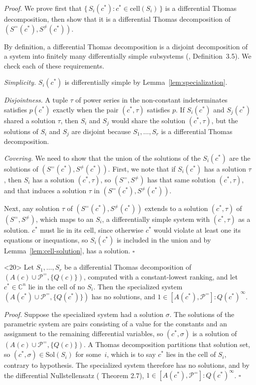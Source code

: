 \documentclass{article}
\theoremstyle{definition}
\theoremstyle{plain}
\newcommand{\qedbox}{\hspace*{\fill}\ensuremath{\square}}
\begin{document}
  {\it Proof.}
  We prove first that $\{\, S_i(c^*) : c^* \in \mathrm{cell}(S_i) \,\}$ is a differential
  Thomas decomposition, then show that it is a differential Thomas decomposition of $(S^=(c^*), S^{\ne}(c^*))$.

  By definition, a differential Thomas decomposition is a disjoint decomposition of a system into finitely many differentially simple
  subsystems (\cite{ThomasDecomp}, Definition~3.5).  We check each of these requirements.

  {\it Simplicity.}  $S_i(c^*)$ is differentially simple by
  Lemma~\ref{lem:specialization}.

  {\it Disjointness.}
  A tuple $\tau$ of power
  series in the non-constant indeterminates satisfies $p(c^*)$ exactly when the pair
  $(c^*, \tau)$ satisfies $p$.
  If $S_i(c^*)$ and $S_j(c^*)$ shared a solution $\tau$, then $S_i$ and $S_j$ would share the solution $(c^*, \tau)$,
  but the solutions of $S_i$ and $S_j$ are disjoint because $S_1, \ldots, S_r$ is a differential Thomas decomposition.

  {\it Covering.}  We need to show that the union of the solutions of the $S_i(c^*)$
  are the solutions of $(S^=(c^*), S^{\ne}(c^*))$.  First, we note that if $S_i(c^*)$
  has a solution $\tau$, then $S_i$ has a solution $(c^*, \tau)$, so $(S^=, S^{\ne})$ has that same solution $(c^*,\tau)$,
  and that induces a solution $\tau$ in $(S^=(c^*), S^{\ne}(c^*))$.

  Next, any solution $\tau$ of $(S^=(c^*), S^{\ne}(c^*))$ extends to a solution $(c^*, \tau)$ of $(S^=, S^{\ne})$,
  which maps to an $S_i$, a differentially simple system with $(c^*, \tau)$ as a solution.
  $c^*$ must lie in its cell, since otherwise $c^*$ would violate at least one its equations
  or inequations,
  so $S_i(c^*)$ is included in the union and by Lemma~\ref{lem:cell-solution}, has a solution.
  \qedbox

  \medskip
  \begin{lemma}<20>
  \label{lem:no-cell-inconsistent}
  Let $S_1, \ldots, S_r$ be a differential Thomas decomposition of
  $(A(c) \cup \mathcal{P}^=, \{Q(c)\})$, computed with a constant-lowest ranking,
  and let $c^* \in \mathbb{C}^n$ lie in the cell of no $S_i$.  Then the
  specialized system $(A(c^*) \cup \mathcal{P}^=, \{Q(c^*)\})$ has no solutions,
  and $1 \in [A(c^*), \mathcal{P}^=] : Q(c^*)^\infty$.
  \end{lemma}

  {\it Proof.}
  Suppose the specialized system had a solution $\sigma$.  The solutions of the
  parametric system are pairs consisting of a value for the constants and an
  assignment to the remaining differential variables, so $(c^*, \sigma)$ is a
  solution of $(A(c) \cup \mathcal{P}^=, \{Q(c)\})$.  A Thomas decomposition
  partitions that solution set, so $(c^*, \sigma) \in \mathrm{Sol}(S_i)$ for
  some~$i$, which is to say $c^*$ lies in
  the cell of $S_i$, contrary to hypothesis.
  The specialized system therefore has no solutions, and by the differential
  Nullstellensatz (\cite{hubert2} Theorem 2.7), $1 \in [A(c^*), \mathcal{P}^=] : Q(c^*)^\infty$.
  \qedbox
\end{document}
